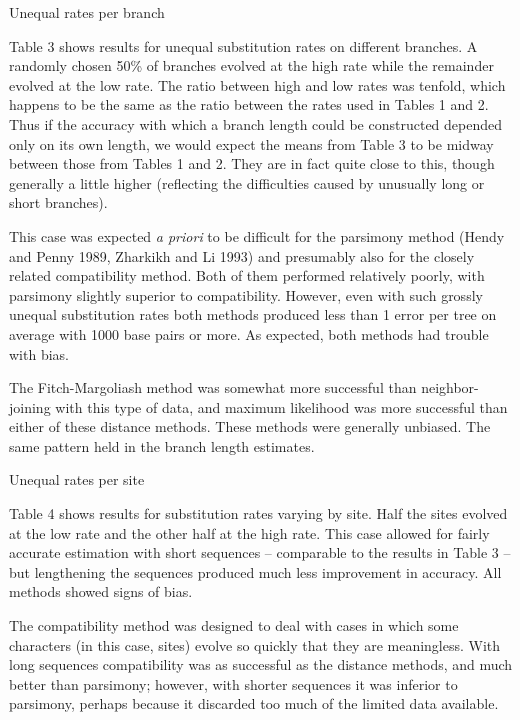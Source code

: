 \bigskip

\noindent
Unequal rates per branch
\bigskip


 Table 3 shows results for 
unequal substitution rates on different branches.  A randomly chosen 
50\% of branches evolved at the high rate while the remainder 
evolved at the low rate.  The ratio between high and low rates was
tenfold, which happens to be the same as the ratio between the
rates used in Tables 1 and 2.  Thus if the accuracy with which a
branch length could be constructed depended only on its own length,
we would expect the means from Table 3 
to be midway between those from Tables 1 and 2. 
They are in fact quite close to this, though generally a little higher 
(reflecting the difficulties caused by unusually long or short 
branches).

	This case was expected {\it a priori} to be difficult for the 
parsimony method (Hendy and Penny 1989, Zharkikh and
Li 1993) and presumably also for the closely related compatibility
method.  Both of them 
performed relatively poorly, with parsimony slightly superior to 
compatibility.  However, even with such grossly unequal substitution rates  
both methods produced less than 1 error per tree on average with 
1000 base pairs or more.  As expected, both methods had trouble with
bias.

	The Fitch-Margoliash method was somewhat more successful than
neighbor-joining with this type of data, and maximum likelihood was
more successful than either of these distance 
methods.  These methods were generally unbiased.  The same 
pattern held in the branch length estimates.
\bigskip

\bigskip

\noindent
Unequal rates per site
\bigskip


  Table 4 shows results for substitution 
rates varying by site.  Half the sites evolved at the low rate and 
the other half at the high rate.  This case allowed for fairly 
accurate estimation with short sequences -- comparable to the 
results in Table 3 -- but lengthening the sequences produced much 
less improvement in accuracy.  All methods showed signs of 
bias.

	The compatibility method was designed to deal with cases in 
which some characters (in this case, sites) evolve so quickly that 
they are meaningless.  With long sequences compatibility was as 
successful as the distance methods, and much better than parsimony; 
however, with shorter sequences it was inferior to parsimony, 
perhaps because it discarded too much of the limited data available.

